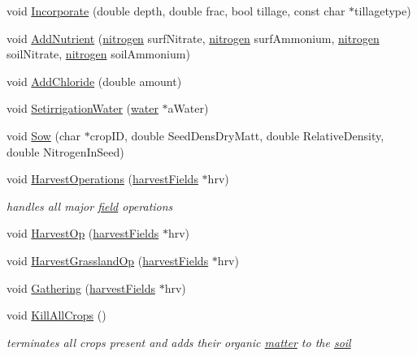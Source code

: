 \begin{DoxyCompactItemize}
\item 
void \hyperlink{classecosystem_a5fb59e12490ad702d87765d64ce74ba2}{Incorporate} (double depth, double frac, bool tillage, const char $\ast$tillagetype)
\item 
void \hyperlink{classecosystem_a36762ab8f1b4b4239c6bbe00c7214701}{AddNutrient} (\hyperlink{classnitrogen}{nitrogen} surfNitrate, \hyperlink{classnitrogen}{nitrogen} surfAmmonium, \hyperlink{classnitrogen}{nitrogen} soilNitrate, \hyperlink{classnitrogen}{nitrogen} soilAmmonium)
\item 
void \hyperlink{classecosystem_a963c60e4ca14481915f72ff7cfbe7eaf}{AddChloride} (double amount)
\item 
void \hyperlink{classecosystem_aee78909c3c7389e4393b13755e2bb6e1}{SetirrigationWater} (\hyperlink{classwater}{water} $\ast$aWater)
\item 
void \hyperlink{classecosystem_ac50dd34f13319a8e97c7009b11d19a5d}{Sow} (char $\ast$cropID, double SeedDensDryMatt, double RelativeDensity, double NitrogenInSeed)
\item 
void \hyperlink{classecosystem_ae27dd7b646f92381708692d7b840a81e}{HarvestOperations} (\hyperlink{classharvest_fields}{harvestFields} $\ast$hrv)
\begin{DoxyCompactList}\small\item\em handles all major \hyperlink{classfield}{field} operations \item\end{DoxyCompactList}\item 
void \hyperlink{classecosystem_ae5431fb2c02834e47a7f8540b1ee6e15}{HarvestOp} (\hyperlink{classharvest_fields}{harvestFields} $\ast$hrv)
\item 
void \hyperlink{classecosystem_a4568fb9f9ba3632f8ae23cdab062059a}{HarvestGrasslandOp} (\hyperlink{classharvest_fields}{harvestFields} $\ast$hrv)
\item 
void \hyperlink{classecosystem_aabf317448ce162f6c103aea18ca05970}{Gathering} (\hyperlink{classharvest_fields}{harvestFields} $\ast$hrv)
\item 
void \hyperlink{classecosystem_ae978ad3f949181bffc509034f73f61f4}{KillAllCrops} ()
\begin{DoxyCompactList}\small\item\em terminates all crops present and adds their organic \hyperlink{classmatter}{matter} to the \hyperlink{classsoil}{soil} \item\end{DoxyCompactList}\item 

\end{DoxyCompactItemize}
